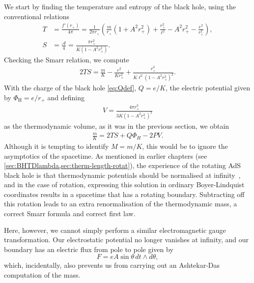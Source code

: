 \documentclass[
twoside,
openright,
frontopenright,
]{dmathesis}
\newcommand{\nn}{\nonumber}
\begin{document}
We start by finding the temperature and entropy of the black hole, using
the conventional relations
\begin{align}
  \label{eq:TSNR}
T &= \frac{f'(r_+)}{4\pi} = \frac{1}{2\pi r_+}\left(\frac{m}{r_+}\left(1+A^2r_+^2
\right) + \frac{r_+^2}{\ell^2} - A^2 r_+^2-\frac{e^2}{r_+^2}\right),\nn\\
S &= \frac{\mathcal{A}}{4} =\frac{\pi r_+^2}{K(1-A^2 r_+^2)}.
\end{align}
Checking the Smarr relation, we compute
\begin{align}
2TS = \frac{m}{K} - \frac{e^2}{K r_+^2} + \frac{r_+^3}{K\ell^2(1-A^2 r_+^2)^2}.
\end{align}
With the charge of the black hole \eqref{eq:Qdef}, $Q = e/K$, the electric
potential given by $\Phi_\mathrm{H} = e/r_+$ and defining 
\begin{align}
  \label{eq:volNR}
V  = \frac{4\pi r_+^3}{3K(1-A^2r_+^2)^2}
\end{align}
as the thermodynamic volume, as it was in the previous section, we obtain
\begin{align}\label{eq:smallsmarr}
\frac{m}{K} = 2 TS  + Q\Phi_H - 2 PV.
\end{align}
Although it is tempting to identify $M=m/K$, this would be to ignore the
asymptotics of the spacetime. As mentioned in earlier chapters (see
\cref{sec:BHTDlambda,sec:therm-length-rotat}), the experience of the rotating
AdS black hole is that thermodynamic potentials should be normalised at
infinity~\cite{Caldarelli:1999xj,Gibbons:2004ai}, and in the case of rotation,
expressing this solution in ordinary Boyer-Lindquist coordinates results in a
spacetime that has a rotating boundary. Subtracting off this rotation leads to
an extra renormalisation of the thermodynamic mass, a correct Smarr formula and
correct first law.

Here, however, we cannot simply perform a similar electromagnetic
gauge transformation. Our electrostatic potential no longer
vanishes at infinity, and our boundary has an electric flux from pole to pole
given by
\begin{equation}
F = eA \sin\theta\, dt \wedge d\theta,
\end{equation}
which, incidentally, also prevents us from carrying out an
Ashtekar-Das~\cite{Ashtekar:1999jx} computation of the mass.
\end{document}
